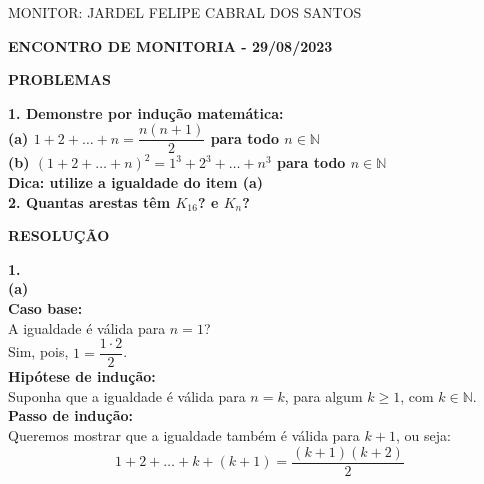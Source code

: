 \documentclass[12pt, a4paper]{article}
\begin{document}
\begin{flushleft}

MONITOR: JARDEL FELIPE CABRAL DOS SANTOS\\[1cm] 
\end{flushleft}

\begin{center} \textbf{ENCONTRO DE MONITORIA - 29/08/2023\\[1cm]}
\end{center}

\begin{center}
\textbf{PROBLEMAS}
\end{center}


\textbf{1. Demonstre por indução matemática:} \\

\textbf{(a) \(1+2+\ldots + n = \dfrac{n(n+1)}{2}\) para todo \(n \in \mathbb{N}\)} \\

\textbf{(b) \((1+2+\ldots + n)^2 = 1^3 + 2^3 + \ldots + n^3\) para todo \(n \in \mathbb{N}\)\\Dica: utilize a igualdade do item (a)} \\

\textbf{2. Quantas arestas têm \(K_{16}\)? e \(K_{n}\)?} \\


\newpage

\begin{center}
\textbf{RESOLUÇÃO}
\end{center}

\textbf{1.} \\

\textbf{(a)} \\

\textbf{Caso base:} \\

A igualdade é válida para \(n=1\)? \\

Sim, pois, \(1 = \dfrac{1\cdot{2}}{2}\).  \\

\textbf{Hipótese de indução:} \\

Suponha que a igualdade é válida para \(n=k\), para algum \(k \geq 1\), com \(k \in \mathbb{N}\). \\

\textbf{Passo de indução:} \\

Queremos mostrar que a igualdade também é válida para \(k+1\), ou seja: \[1+2+\ldots + k + (k+1) = \dfrac{(k+1)(k+2)}{2}\]
\end{document}

